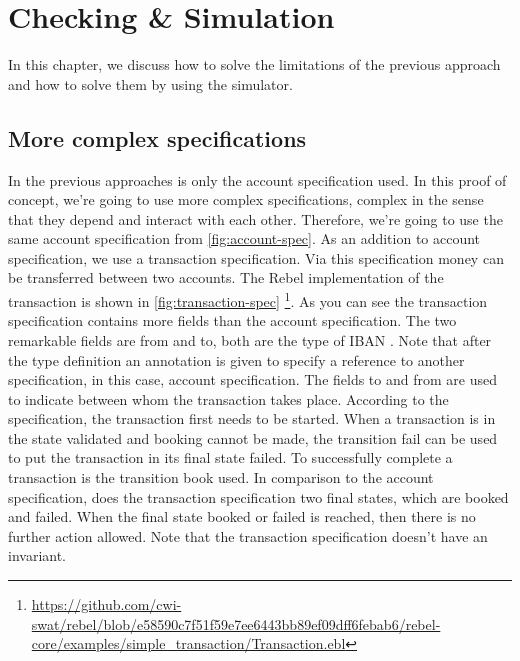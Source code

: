 \chapter{Checking \& Simulation}
\label{sec:ch5}

In this chapter, we discuss how to solve the limitations of the previous approach and how to solve them by using the simulator. 

\section{More complex specifications}
In the previous approaches is only the account specification used. In this proof of concept, we're going to use more complex specifications, complex in the sense that they depend and interact with each other. Therefore, we're going to use the same account specification from \autoref{fig:account-spec}. As an addition to account specification, we use a transaction specification. Via this specification money can be transferred between two accounts.
The Rebel implementation of the transaction is shown in \autoref{fig:transaction-spec} \footnote{\url{https://github.com/cwi-swat/rebel/blob/e58590c7f51f59e7ee6443bb89ef09dff6febab6/rebel-core/examples/simple_transaction/Transaction.ebl}}. As you can see the transaction specification contains more fields than the account specification. The two remarkable fields are from and to, both are the type of IBAN . Note that after the type definition an annotation is given to specify a reference to another specification, in this case, account specification. The fields to and from are used to indicate between whom the transaction takes place. According to the specification, the transaction first needs to be started. When a transaction is in the state validated and booking cannot be made, the transition fail can be used to put the transaction in its final state failed. To successfully complete a transaction is the transition book used. In comparison to the account specification, does the transaction specification two final states, which are booked and failed. When the final state booked or failed is reached, then there is no further action allowed. Note that the transaction specification doesn't have an invariant. 

